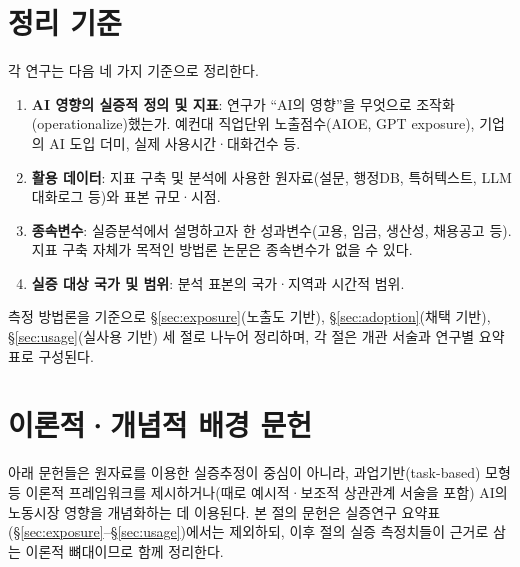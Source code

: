 \documentclass[11pt]{article}
\begin{document}
\section{정리 기준}

각 연구는 다음 네 가지 기준으로 정리한다.

\begin{enumerate}[label=(\arabic*)]
  \item \textbf{AI 영향의 실증적 정의 및 지표}: 연구가 ``AI의 영향''을 무엇으로 조작화(operationalize)했는가. 예컨대 직업단위 노출점수(AIOE, GPT exposure), 기업의 AI 도입 더미, 실제 사용시간·대화건수 등.
  \item \textbf{활용 데이터}: 지표 구축 및 분석에 사용한 원자료(설문, 행정DB, 특허텍스트, LLM 대화로그 등)와 표본 규모·시점.
  \item \textbf{종속변수}: 실증분석에서 설명하고자 한 성과변수(고용, 임금, 생산성, 채용공고 등). 지표 구축 자체가 목적인 방법론 논문은 종속변수가 없을 수 있다.
  \item \textbf{실증 대상 국가 및 범위}: 분석 표본의 국가·지역과 시간적 범위.
\end{enumerate}

측정 방법론을 기준으로 \S\ref{sec:exposure}(노출도 기반), \S\ref{sec:adoption}(채택 기반), \S\ref{sec:usage}(실사용 기반) 세 절로 나누어 정리하며, 각 절은 개관 서술과 연구별 요약표로 구성된다.

\section{이론적·개념적 배경 문헌}
\label{sec:theory}

아래 문헌들은 원자료를 이용한 실증추정이 중심이 아니라, 과업기반(task-based) 모형 등 이론적 프레임워크를 제시하거나(때로 예시적·보조적 상관관계 서술을 포함) AI의 노동시장 영향을 개념화하는 데 이용된다. 본 절의 문헌은 실증연구 요약표(\S\ref{sec:exposure}--\S\ref{sec:usage})에서는 제외하되, 이후 절의 실증 측정치들이 근거로 삼는 이론적 뼈대이므로 함께 정리한다.
\end{document}
